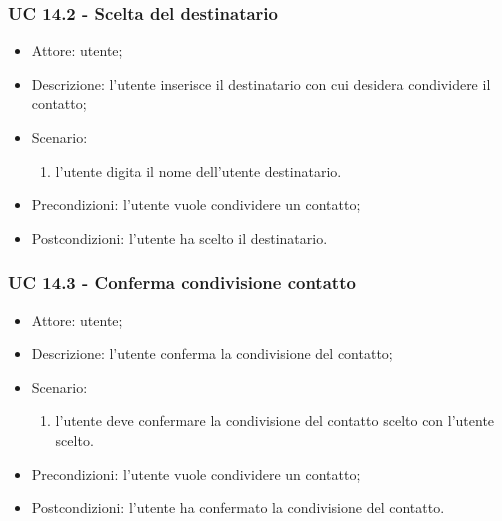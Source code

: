 \subsubsection{UC 14.2 - Scelta del destinatario} \label{sec: UC 14.2}
\begin{itemize}
    \item Attore: utente;
    \item Descrizione: l'utente inserisce il destinatario con cui desidera condividere il contatto;
    \item Scenario:
        \begin{enumerate}
        \item l'utente digita il nome dell'utente destinatario.
        \end{enumerate}
    
    \item Precondizioni: l'utente vuole condividere un contatto;
    \item Postcondizioni: l'utente ha scelto il destinatario.
\end{itemize}


\subsubsection{UC 14.3 - Conferma condivisione contatto} \label{sec: UC 14.3}
\begin{itemize}
    \item Attore: utente;
    \item Descrizione: l'utente conferma la condivisione del contatto;
    \item Scenario:
        \begin{enumerate}
        \item l'utente deve confermare la condivisione del contatto scelto con l'utente scelto.
        \end{enumerate}
    
    \item Precondizioni: l'utente vuole condividere un contatto;
    \item Postcondizioni: l'utente ha confermato la condivisione del contatto.
\end{itemize}

